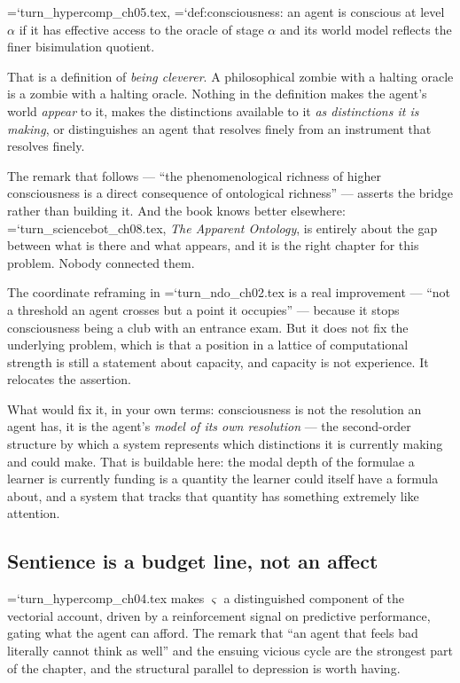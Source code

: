 \documentclass[11pt,letterpaper]{article}
\newcommand{\loc}[1]{{\small\ttfamily\color{accent}\hyphenchar\font=`\-\relax #1}}
\begin{document}
\loc{turn\_hypercomp\_ch05.tex}, \loc{def:consciousness}: an agent is
conscious at level $\alpha$ if it has effective access to the oracle of
stage $\alpha$ and its world model reflects the finer bisimulation
quotient.

That is a definition of \emph{being cleverer}. A philosophical zombie
with a halting oracle is a zombie with a halting oracle. Nothing in the
definition makes the agent's world \emph{appear} to it, makes the
distinctions available to it \emph{as distinctions it is making}, or
distinguishes an agent that resolves finely from an instrument that
resolves finely.

The remark that follows --- ``the phenomenological richness of higher
consciousness is a direct consequence of ontological richness'' ---
asserts the bridge rather than building it. And the book knows better
elsewhere: \loc{turn\_sciencebot\_ch08.tex}, \emph{The Apparent
Ontology}, is entirely about the gap between what is there and what
appears, and it is the right chapter for this problem. Nobody connected
them.

The coordinate reframing in \loc{turn\_ndo\_ch02.tex} is a real
improvement --- ``not a threshold an agent crosses but a point it
occupies'' --- because it stops consciousness being a club with an
entrance exam. But it does not fix the underlying problem, which is
that a position in a lattice of computational strength is still a
statement about capacity, and capacity is not experience. It relocates
the assertion.

What would fix it, in your own terms: consciousness is not the
resolution an agent has, it is the agent's \emph{model of its own
resolution} --- the second-order structure by which a system represents
which distinctions it is currently making and could make. That is
buildable here: the modal depth of the formulae a learner is currently
funding is a quantity the learner could itself have a formula about,
and a system that tracks that quantity has something extremely like
attention.

\subsection*{Sentience is a budget line, not an affect}

\loc{turn\_hypercomp\_ch04.tex} makes $\varsigma$ a distinguished
component of the vectorial account, driven by a reinforcement signal
on predictive performance, gating what the agent can afford. The
remark that ``an agent that feels bad literally cannot think as well''
and the ensuing vicious cycle are the strongest part of the chapter,
and the structural parallel to depression is worth having.
\end{document}
